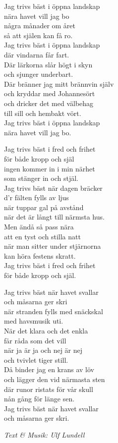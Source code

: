 \vspace{10pt}
Jag trivs bäst i öppna landskap\\
nära havet vill jag bo\\
några månader om året\\
så att själen kan få ro.\\
Jag trivs bäst i öppna landskap\\
där vindarna får fart.\\
Där lärkorna slår högt i skyn\\
och sjunger underbart.\\
Där bränner jag mitt brännvin själv\\
och kryddar med Johannesört\\
och dricker det med välbehag\\
till sill och hembakt vört.\\
Jag trivs bäst i öppna landskap\\
nära havet vill jag bo.\par
\vspace{10pt}
Jag trivs bäst i fred och frihet\\
för både kropp och själ\\
ingen kommer in i min närhet\\
som stänger in och stjäl.\\
Jag trivs bäst när dagen bräcker\\
d'r fälten fylls av ljus\\
när tuppar gal på avstånd\\
när det är långt till närmsta hus.\\
Men ändå så pass nära\\
att en tyst och stilla natt\\
när man sitter under stjärnorna\\
kan höra festens skratt.\\
Jag trivs bäst i fred och frihet\\
för både kropp och själ.\par
\vspace{10pt}
Jag trivs bäst när havet svallar\\
och måsarna ger skri\\
när stranden fylls med snäckskal\\
med havsmusik uti.\\
När det klara och det enkla\\
får råda som det vill\\
när ja är ja och nej är nej\\
och tvivlet tiger still.\\
Då binder jag en krans av löv\\
och lägger den vid närmasta sten\\
där runor ristats för vår skull\\
nån gång för länge sen.\\
Jag trivs bäst när havet svallar\\
och måsarna ger skri.\par
\vspace{10pt}
{\footnotesize\textit{Text \& Musik: Ulf Lundell}}
